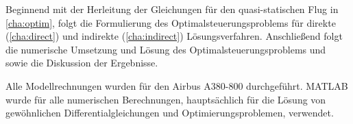 Beginnend mit der Herleitung der Gleichungen für den quasi-statischen Flug in \autoref{cha:optim}, folgt die Formulierung des Optimalsteuerungsproblems für direkte (\autoref{cha:direct}) und indirekte (\autoref{cha:indirect}) Lösungsverfahren. Anschließend folgt die numerische Umsetzung und Lösung des Optimalsteuerungsproblems und sowie die Diskussion der Ergebnisse.

Alle Modellrechnungen wurden für den Airbus A380-800 \cite{A380Tech} durchgeführt. MATLAB wurde für alle numerischen Berechnungen, hauptsächlich für die Lösung von gewöhnlichen Differentialgleichungen und Optimierungsproblemen, verwendet.




